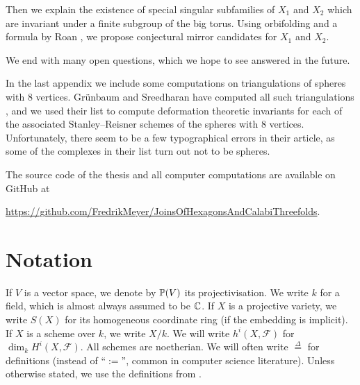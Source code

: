 \begin{itemize}
Then we explain the existence of special singular subfamilies of $X_1$ and $X_2$ which are invariant under a finite subgroup of the big torus. Using {orbifolding} and a formula by Roan \cite{roan_euler}, we propose conjectural mirror candidates for $X_1$ and $X_2$.

We end with many open questions, which we hope to see answered in the future.
\end{itemize}

In the last appendix we include some computations on triangulations of spheres with $8$ vertices. Grünbaum and Sreedharan have computed all such triangulations \cite{grunbaum_enumeration}, and we used their list to compute deformation theoretic invariants for each of the associated Stanley--Reisner schemes of the spheres with $8$ vertices. Unfortunately, there seem to be a few typographical errors in their article, as some of the complexes in their list turn out not to be spheres.

The source code of the thesis and all computer computations are available on GitHub at
\begin{center}
\small{\url{https://github.com/FredrikMeyer/JoinsOfHexagonsAndCalabiThreefolds}}.
\end{center}

\section{Notation}

If $V$ is a vector space, we denote by $\P(V)$ its projectivisation. We write $k$ for a field, which is almost always assumed to be $\C$. If $X$ is a projective variety, we write $S(X)$ for its homogeneous coordinate ring (if the embedding is implicit). If $X$ is a scheme over $k$, we write $X/k$. We will write $h^i(X,\mathscr F)$ for $\dim_k H^i(X,\mathscr F)$. All schemes are noetherian. We will often write $\stackrel \Delta = $ for definitions (instead of  ``$:=$'', common in computer science literature). Unless otherwise stated, we use the definitions from \cite{hartshorne}.